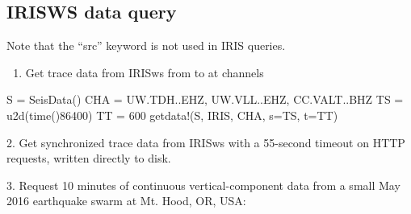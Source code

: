 \documentclass[letterpaper,11pt,english]{sphinxmanual}
\begin{document}
\subsection{IRISWS data query}
\label{\detokenize{src/Appendices/examples:irisws-data-query}}
Note that the “src” keyword is not used in IRIS queries.
\begin{enumerate}
\def\theenumi{\arabic{enumi}}
\def\labelenumi{\theenumi .}
\makeatletter\def\p@enumii{\p@enumi \theenumi .}\makeatother
\item {} 
Get trace data from IRISws from  to  at channels 

\end{enumerate}

\begin{sphinxVerbatim}[commandchars=\\\{\}]
S = SeisData()
CHA = \PYGZdq{}UW.TDH..EHZ, UW.VLL..EHZ, CC.VALT..BHZ\PYGZdq{}
TS = u2d(time()\PYGZhy{}86400)
TT = 600
get\PYGZus{}data!(S, \PYGZdq{}IRIS\PYGZdq{}, CHA, s=TS, t=TT)
\end{sphinxVerbatim}

2. Get synchronized trace data from IRISws with a 55-second timeout on HTTP requests, written directly to disk.

\begin{sphinxVerbatim}[commandchars=\\\{\}]
  
  
  
        
\end{sphinxVerbatim}

3. Request 10 minutes of continuous vertical-component data from a small May 2016 earthquake swarm at Mt. Hood, OR, USA:

\begin{sphinxVerbatim}[commandchars=\\\{\}]
  
     
      
\end{sphinxVerbatim}
\end{document}

